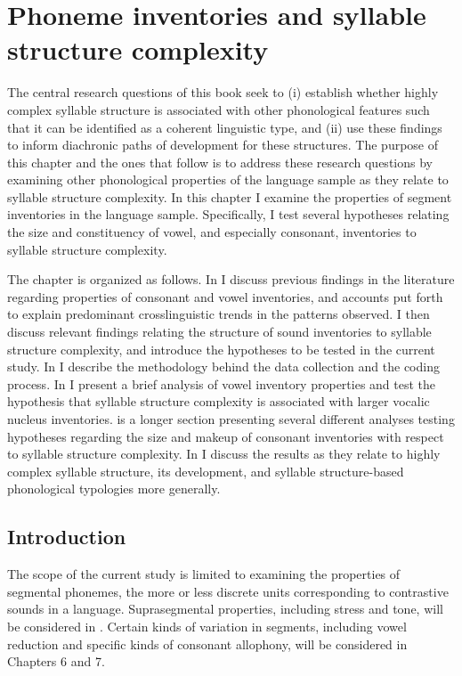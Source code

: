 \chapter{Phoneme inventories and syllable structure complexity}\label{sec:4}

  The central research questions of this book seek to (i) establish whether highly complex syllable structure is associated with other phonological features such that it can be identified as a coherent linguistic type, and (ii) use these findings to inform diachronic paths of development for these structures. The purpose of this chapter and the ones that follow is to address these research questions by examining other phonological properties of the language sample as they relate to syllable structure complexity. In this chapter I examine the properties of segment inventories in the language sample. Specifically, I test several hypotheses relating the size and constituency of vowel, and especially consonant, inventories to syllable structure complexity.

  The chapter is organized as follows. In  I discuss previous findings in the literature regarding properties of consonant and vowel inventories, and accounts put forth to explain predominant crosslinguistic trends in the patterns observed. I then discuss relevant findings relating the structure of sound inventories to syllable structure complexity, and introduce the hypotheses to be tested in the current study. In  I describe the methodology behind the data collection and the coding process. In  I present a brief analysis of vowel inventory properties and test the hypothesis that syllable structure complexity is associated with larger vocalic nucleus inventories.  is a longer section presenting several different analyses testing hypotheses regarding the size and makeup of consonant inventories with respect to syllable structure complexity. In  I discuss the results as they relate to highly complex syllable structure, its development, and syllable structure-based phonological typologies more generally.

\section{Introduction}\label{sec:4.1}

  The scope of the current study is limited to examining the properties of segmental phonemes, the more or less discrete units corresponding to contrastive sounds in a language. Suprasegmental properties, including stress and tone, will be considered in . Certain kinds of variation in segments, including vowel reduction and specific kinds of consonant allophony, will be considered in Chapters 6 and 7.

